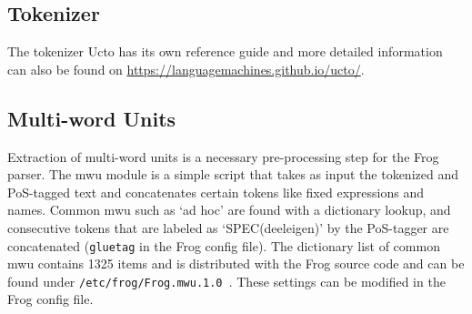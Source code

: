 \documentclass{book}
\begin{document}

\subsection{Tokenizer}
\label{sec-bg-tok}

The tokenizer Ucto has its own reference guide \cite{UCTO} and more detailed information can also be found on \url{https://languagemachines.github.io/ucto/}.


\subsection{Multi-word Units}

Extraction of multi-word units is a necessary pre-processing step for the Frog parser.
The mwu module is a simple script that takes as input the tokenized and PoS-tagged text and concatenates certain tokens like fixed expressions and names. Common mwu such as `ad hoc' are found with a dictionary lookup, and consecutive tokens that are labeled as `SPEC(deeleigen)' by the PoS-tagger are concatenated ({\tt gluetag} in the Frog config file).
The dictionary list of common mwu contains 1325 items and is distributed with the Frog source code and can be found under {\tt /etc/frog/Frog.mwu.1.0 }. These settings can be modified in the Frog config file.

\end{document}
